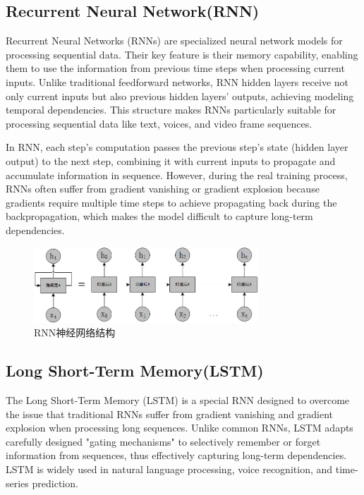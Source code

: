 \subsection{Recurrent Neural Network(RNN)}

Recurrent Neural Networks (RNNs) are specialized neural network models for processing sequential data. Their key feature is their memory capability, enabling them to use the information from previous time steps when processing current inputs. Unlike traditional feedforward networks, RNN hidden layers receive not only current inputs but also previous hidden layers’ outputs, achieving modeling temporal dependencies. This structure makes RNNs particularly suitable for processing sequential data like text, voices, and video frame sequences.

In RNN, each step's computation passes the previous step's state (hidden layer output) to the next step, combining it with current inputs to propagate and accumulate information in sequence. However, during the real training process, RNNs often suffer from gradient vanishing or gradient explosion because gradients require multiple time steps to achieve propagating back during the backpropagation, which makes the model difficult to capture long-term dependencies.

\begin{figure}[hbt]
	\centering
	\includegraphics[width=0.75\textwidth]{figures/2.4}
	\caption{RNN神经网络结构}\label{fig:2.4}
\end{figure}

\subsection{Long Short-Term Memory(LSTM)}

The Long Short-Term Memory (LSTM) \cite{graves2012long} is a special RNN designed to overcome the issue that traditional RNNs suffer from gradient vanishing and gradient explosion when processing long sequences. Unlike common RNNs, LSTM adapts carefully designed "gating mechanisms" to selectively remember or forget information from sequences, thus effectively capturing long-term dependencies. LSTM is widely used in natural language processing, voice recognition, and time-series prediction.

